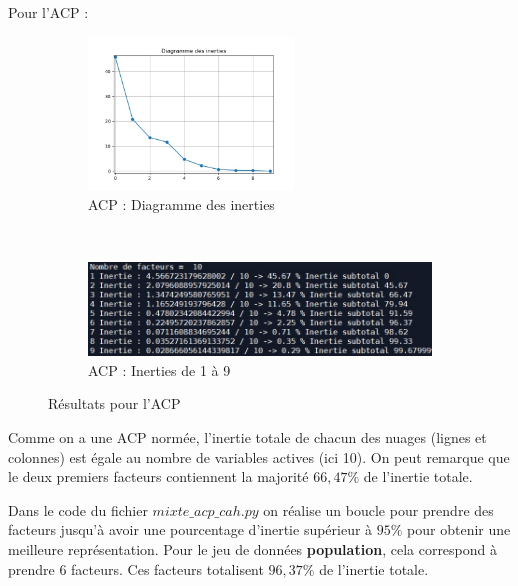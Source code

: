 Pour l'ACP :

\begin{figure}[!htb]
        \begin{subfigure}[b]{1.0\textwidth}
            \centering
            \includegraphics[width=0.6\textwidth]{img/mixte_acp_cah/diagramme_des_inerties.jpg}
            \caption{ACP : Diagramme des inerties}
            \label{Label_diagramme_des_inerties.jpg}
        \end{subfigure}\\
        
        \begin{subfigure}[b]{1.0\textwidth}
            \centering
            \includegraphics[width=1.0\textwidth]{img/mixte_acp_cah/inerties_acp.jpg}
            \caption{ACP : Inerties de 1 à 9}
            \label{Label_inerties_acp.jpg}
        \end{subfigure}
        \caption{Résultats pour l'ACP}
        \label{Label_inerties}
    \end{figure}
    
    Comme on a une ACP normée, l’inertie totale de chacun des nuages (lignes et colonnes) est égale au nombre de variables actives (ici 10). On peut remarque que le deux premiers facteurs contiennent la majorité $66,47\%$ de l'inertie totale. 
    
    Dans le code du fichier $mixte\_acp\_cah.py$ on réalise un boucle pour prendre des facteurs jusqu'à avoir une pourcentage d'inertie supérieur à $95\%$ pour obtenir une meilleure représentation. Pour le jeu de données \textbf{population}, cela correspond à prendre $6$ facteurs. Ces facteurs totalisent $96,37\%$ de l'inertie totale.
    
